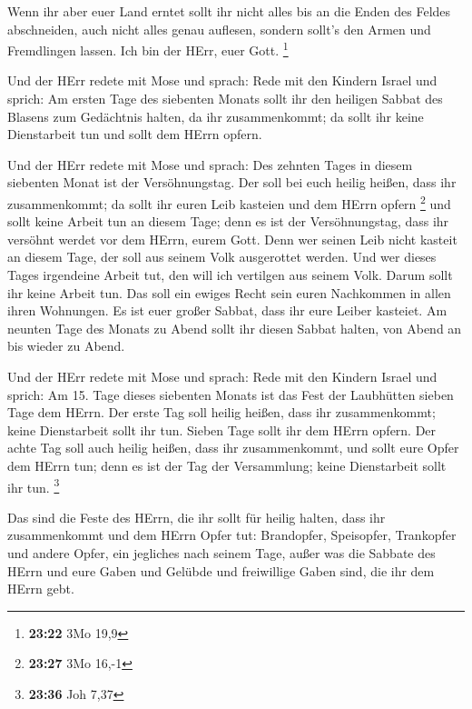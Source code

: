  Wenn ihr aber euer Land erntet sollt ihr nicht alles bis
an die Enden des Feldes abschneiden, auch nicht alles genau auflesen,
sondern sollt's den Armen und Fremdlingen lassen. Ich bin der HErr, euer
Gott. \footnote{\textbf{23:22} 3Mo 19,9}

 Und der HErr redete mit Mose und sprach: 
Rede mit den Kindern Israel und sprich: Am ersten Tage des siebenten
Monats sollt ihr den heiligen Sabbat des Blasens zum Gedächtnis halten,
da ihr zusammenkommt;  da sollt ihr keine Dienstarbeit tun
und sollt dem HErrn opfern.

 Und der HErr redete mit Mose und sprach:  Des
zehnten Tages in diesem siebenten Monat ist der Versöhnungstag. Der soll
bei euch heilig heißen, dass ihr zusammenkommt; da sollt ihr euren Leib
kasteien und dem HErrn opfern \footnote{\textbf{23:27} 3Mo 16,-1}
 und sollt keine Arbeit tun an diesem Tage; denn es ist der
Versöhnungstag, dass ihr versöhnt werdet vor dem HErrn, eurem Gott.
 Denn wer seinen Leib nicht kasteit an diesem Tage, der
soll aus seinem Volk ausgerottet werden.  Und wer dieses
Tages irgendeine Arbeit tut, den will ich vertilgen aus seinem Volk.
 Darum sollt ihr keine Arbeit tun. Das soll ein ewiges
Recht sein euren Nachkommen in allen ihren Wohnungen.  Es
ist euer großer Sabbat, dass ihr eure Leiber kasteiet. Am neunten Tage
des Monats zu Abend sollt ihr diesen Sabbat halten, von Abend an bis
wieder zu Abend.

 Und der HErr redete mit Mose und sprach: 
Rede mit den Kindern Israel und sprich: Am 15. Tage dieses siebenten
Monats ist das Fest der Laubhütten sieben Tage dem HErrn. 
Der erste Tag soll heilig heißen, dass ihr zusammenkommt; keine
Dienstarbeit sollt ihr tun.  Sieben Tage sollt ihr dem
HErrn opfern. Der achte Tag soll auch heilig heißen, dass ihr
zusammenkommt, und sollt eure Opfer dem HErrn tun; denn es ist der Tag
der Versammlung; keine Dienstarbeit sollt ihr tun. \footnote{\textbf{23:36}
  Joh 7,37}

 Das sind die Feste des HErrn, die ihr sollt für heilig
halten, dass ihr zusammenkommt und dem HErrn Opfer tut: Brandopfer,
Speisopfer, Trankopfer und andere Opfer, ein jegliches nach seinem Tage,
 außer was die Sabbate des HErrn und eure Gaben und Gelübde
und freiwillige Gaben sind, die ihr dem HErrn gebt.

